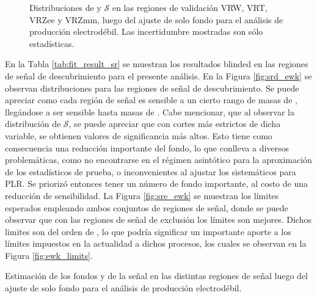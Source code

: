 \begin{figure}
    \caption{Distribuciones de \met y $\mathcal{S}$ en las regiones de validación VRW, VRT, VRZee y VRZmm, luego del ajuste de solo fondo para el análisis de producción electrodébil. Las incertidumbre mostradas son sólo estadísticas.}
    \label{fig:vr_ewk}

\end{figure}

En la Tabla \ref{tab:fit_result_sr} se muestran los resultados blinded en las regiones de señal de descubrimiento para el presente análisis. En la Figura \ref{fig:srd_ewk} se observan distribuciones para las regiones de señal de descubrimiento. Se puede apreciar como cada región de señal es sensible a un cierto rango de masas de \ninoone, llegándose a ser sensible hasta masas de . Cabe mencionar, que al observar la distribución de $\mathcal{S}$, se puede apreciar que con cortes más estrictos de dicha variable, se obtienen valores de significancia más altos. Esto tiene como consecuencia una reducción importante del fondo, lo que conlleva a diversos problemáticas, como no encontrarse en el régimen asintótico para la aproximación de los estadísticos de prueba, o inconvenientes al ajustar los sistemáticos para PLR. Se priorizó entonces tener un número de fondo importante, al costo de una reducción de sensibilidad.
La Figura \ref{fig:sre_ewk} se muestran los límites esperados empleando ambos conjuntos de regiones de señal, donde se puede observar que con las regiones de señal de exclusión los límites son mejores.
Dichos limites son del orden de , lo que podría significar un importante aporte a los límites impuestos en la actualidad a dichos procesos, los cuales se observan en la Figura \ref{fig:ewk_limits}.


\begin{table}[ht!]
  \centering
  \caption{Estimación de los fondos y de la señal en las distintas regiones de señal luego del ajuste de solo fondo para el análisis de producción electrodébil.}
  \resizebox{\textwidth}{!}{}
  \label{tab:fit_result_sr}
\end{table}


